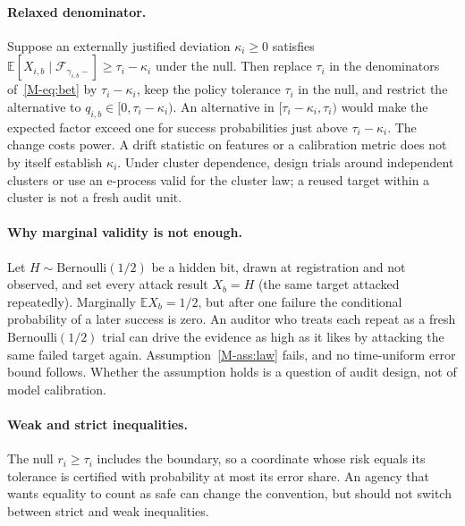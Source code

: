 \documentclass{jpc}
\newcommand{\F}{\mathcal F}
\newcommand{\E}{\mathbb E}
\begin{document}
\paragraph{Relaxed denominator.} Suppose an externally justified deviation $\kappa_i\ge0$ satisfies $\E[X_{i,b}\mid\F_{\gamma_{i,b}-}]\ge\tau_i-\kappa_i$ under the null. Then replace $\tau_i$ in the denominators of~\eqref{M-eq:bet} by $\tau_i-\kappa_i$, keep the policy tolerance $\tau_i$ in the null, and restrict the alternative to $q_{i,b}\in[0,\tau_i-\kappa_i)$. An alternative in $[\tau_i-\kappa_i,\tau_i)$ would make the expected factor exceed one for success probabilities just above $\tau_i-\kappa_i$. The change costs power. A drift statistic on features or a calibration metric does not by itself establish $\kappa_i$. Under cluster dependence, design trials around independent clusters or use an e-process valid for the cluster law; a reused target within a cluster is not a fresh audit unit.

\paragraph{Why marginal validity is not enough.} Let $H\sim\mathrm{Bernoulli}(1/2)$ be a hidden bit, drawn at registration and not observed, and set every attack result $X_b=H$ (the same target attacked repeatedly). Marginally $\E X_b=1/2$, but after one failure the conditional probability of a later success is zero. An auditor who treats each repeat as a fresh $\mathrm{Bernoulli}(1/2)$ trial can drive the evidence as high as it likes by attacking the same failed target again. Assumption~\ref{M-ass:law} fails, and no time-uniform error bound follows. Whether the assumption holds is a question of audit design, not of model calibration.

\paragraph{Weak and strict inequalities.} The null $r_i\ge\tau_i$ includes the boundary, so a coordinate whose risk equals its tolerance is certified with probability at most its error share. An agency that wants equality to count as safe can change the convention, but should not switch between strict and weak inequalities.
\end{document}
